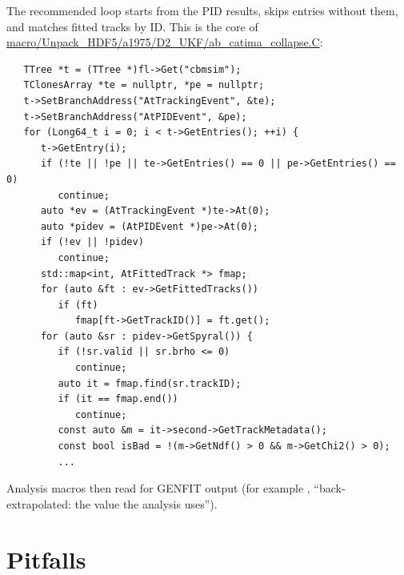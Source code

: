 The recommended loop starts from the PID results, skips entries without them, and matches fitted tracks by ID. This
is the core of \url{macro/Unpack_HDF5/a1975/D2_UKF/ab_catima_collapse.C}:
\begin{verbatim}
   TTree *t = (TTree *)fl->Get("cbmsim");
   TClonesArray *te = nullptr, *pe = nullptr;
   t->SetBranchAddress("AtTrackingEvent", &te);
   t->SetBranchAddress("AtPIDEvent", &pe);
   for (Long64_t i = 0; i < t->GetEntries(); ++i) {
      t->GetEntry(i);
      if (!te || !pe || te->GetEntries() == 0 || pe->GetEntries() == 0)
         continue;
      auto *ev = (AtTrackingEvent *)te->At(0);
      auto *pidev = (AtPIDEvent *)pe->At(0);
      if (!ev || !pidev)
         continue;
      std::map<int, AtFittedTrack *> fmap;
      for (auto &ft : ev->GetFittedTracks())
         if (ft)
            fmap[ft->GetTrackID()] = ft.get();
      for (auto &sr : pidev->GetSpyral()) {
         if (!sr.valid || sr.brho <= 0)
            continue;
         auto it = fmap.find(sr.trackID);
         if (it == fmap.end())
            continue;
         const auto &m = it->second->GetTrackMetadata();
         const bool isBad = !(m->GetNdf() > 0 && m->GetChi2() > 0);
         ...
\end{verbatim}
Analysis macros then read  for GENFIT output (for example
, ``back-extrapolated: the value the analysis uses'').

\section{Pitfalls}
\label{sec:fit-pitfalls}


